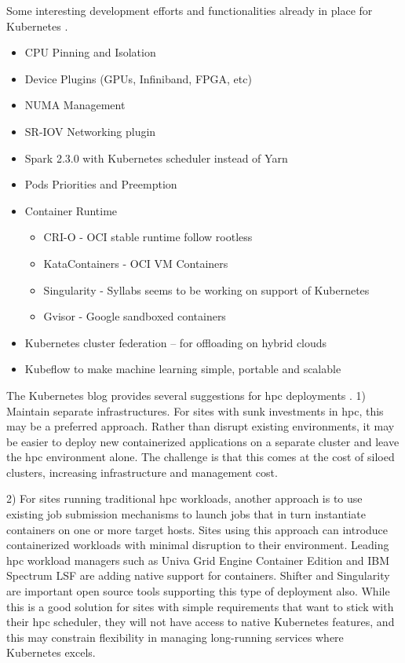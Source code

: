 \documentclass[conference]{IEEEtran}
\begin{document}
Some interesting development efforts and functionalities already in place for Kubernetes \cite{kubecon-2018}.
\begin{itemize}
    \item CPU Pinning and Isolation
    \item Device Plugins (GPUs, Infiniband, FPGA, etc)
    \item NUMA Management
    \item SR-IOV Networking plugin
    \item Spark 2.3.0 with Kubernetes scheduler instead of Yarn
    \item Pods Priorities and Preemption
    \item Container Runtime
        \begin{itemize}
        \item CRI-O - OCI stable runtime follow rootless
        \item KataContainers - OCI VM Containers
        \item Singularity - Syllabs seems to be working on support of Kubernetes
        \item Gvisor - Google sandboxed containers
    \end{itemize}
    \item Kubernetes cluster federation – for offloading on hybrid clouds
    \item Kubeflow to make machine learning simple, portable and scalable
\end{itemize}

The Kubernetes blog provides several suggestions for \gls{hpc} deployments \cite{kubernetes-blog-hpc}. 1) Maintain separate infrastructures. For sites with sunk investments in \gls{hpc}, this may be a preferred approach. Rather than disrupt existing environments, it may be easier to deploy new containerized applications on a separate cluster and leave the \gls{hpc} environment alone. The challenge is that this comes at the cost of siloed clusters, increasing infrastructure and management cost.

2) For sites running traditional \gls{hpc} workloads, another approach is to use existing job submission mechanisms to launch jobs that in turn instantiate containers on one or more target hosts. Sites using this approach can introduce containerized workloads with minimal disruption to their environment. Leading \gls{hpc} workload managers such as Univa Grid Engine Container Edition and IBM Spectrum LSF are adding native support for containers. Shifter and Singularity are important open source tools supporting this type of deployment also. While this is a good solution for sites with simple requirements that want to stick with their \gls{hpc} scheduler, they will not have access to native Kubernetes features, and this may constrain flexibility in managing long-running services where Kubernetes excels.
\end{document}
